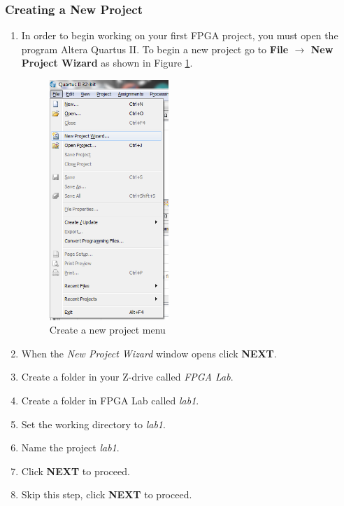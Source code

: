 \subsubsection{Creating a New Project}
\begin{enumerate}
	\item In order to begin working on your first FPGA project, you must open the program Altera Quartus II. To begin a new project go to  {\bf File $\rightarrow$ New Project Wizard} as shown in Figure \ref{fig:step1}.

	\begin{figure}[H]
		\centering
		\includegraphics[width=45mm]{Lab1/figures/step1.png}
		\caption{Create a new project menu}
		\label{fig:step1}
	\end{figure}

	\item When the \emph{New Project Wizard} window opens click {\bf NEXT}.

	\item Create a folder in your Z-drive called \emph{FPGA Lab}.

	\item Create a folder in FPGA Lab called \emph{lab1}.

	\item Set the working directory to \emph{lab1}.

	\item Name the project \emph{lab1}.

	\item Click {\bf NEXT} to proceed.

	\item Skip this step, click  {\bf NEXT} to proceed.


\end{enumerate}
